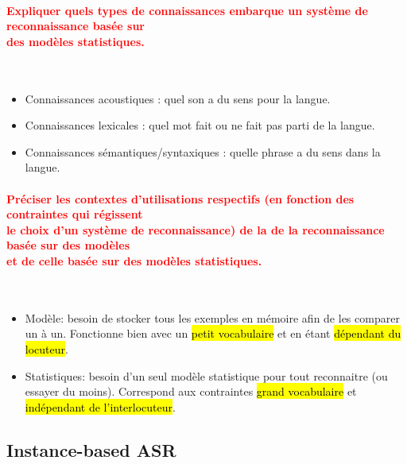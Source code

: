 \documentclass[letterpaper, 12pt]{article}
\newcommand{\red}[1]{
	\textcolor{red}{#1}
}
\begin{document}
		\paragraph{\red{Expliquer quels types de connaissances embarque un système de reconnaissance basée sur 
		~\\ \hspace*{0.035cm} des modèles statistiques.}}~\\
			\vspace*{-0.45cm}
			\begin{itemize}
				\setlength{\itemsep}{0pt}		
				\setlength{\parskip}{0pt}		
				\setlength{\parsep}{0pt}	
				\item Connaissances acoustiques : quel son a du sens pour la langue.
				\item Connaissances lexicales : quel mot fait ou ne fait pas parti de la langue.
				\item Connaissances sémantiques/syntaxiques : quelle phrase a du sens dans la langue.
			\end{itemize}		
		\paragraph{\red{Préciser les contextes d'utilisations respectifs (en fonction des contraintes qui régissent 
		~\\ \hspace*{0.035cm} le choix d'un système de reconnaissance) de la de la reconnaissance basée sur des 
		modèles ~\\ \hspace*{0.035cm} et de celle basée sur des modèles statistiques.}}~\\
			\vspace*{-0.45cm}
			\begin{itemize}
				\setlength{\itemsep}{0pt}		
				\setlength{\parskip}{0pt}		
				\setlength{\parsep}{0pt}	
				\item Modèle: besoin de stocker tous les exemples en mémoire afin de les comparer un à un. 
					Fonctionne bien avec un \hl{petit vocabulaire} et en étant \hl{d\'ependant du locuteur}.
				\item Statistiques: besoin d'un seul modèle statistique pour tout reconnaitre (ou essayer du moins).
					Correspond aux contraintes \hl{grand vocabulaire} et \hl{ind\'ependant de l'interlocuteur}.
			\end{itemize}
	\subsection{Instance-based ASR}
\end{document}
